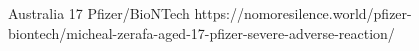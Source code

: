           {
            Australia
          }
          {
            17
          }
          {
            Pfizer/BioNTech
          }
          {
          }
          {
          }
          {
            https://nomoresilence.world/pfizer-biontech/micheal-zerafa-aged-17-pfizer-severe-adverse-reaction/
          }

